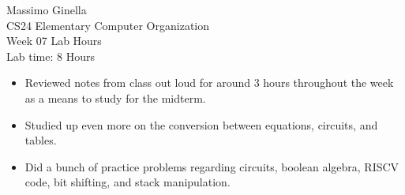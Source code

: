 \documentclass[12pt]{article}
\begin{document}
	\begin{center}
		Massimo Ginella \\
		CS24 Elementary Computer Organization \\
		Week 07 Lab Hours \\
		Lab time: 8 Hours \vspace{0.5cm} \\
	\end{center}
	
	\begin{itemize}
		\item Reviewed notes from class out loud for around 3 hours throughout the week as a means to study for the midterm.
		\item Studied up even more on the conversion between equations, circuits, and tables. 
		\item Did a bunch of practice problems regarding circuits, boolean algebra, RISCV code, bit shifting, and stack manipulation.
	\end{itemize}
	
	
	
\end{document}
